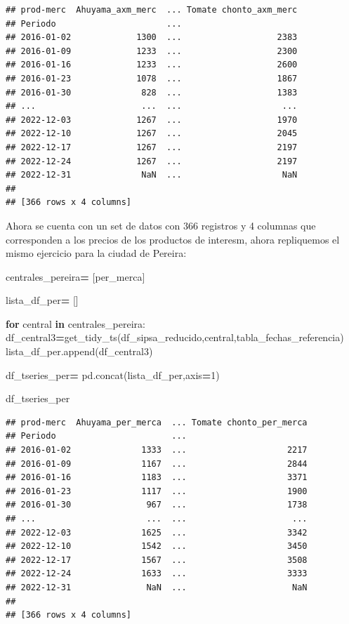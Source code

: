 \documentclass[
]{book}
\newenvironment{Shaded}{\begin{snugshade}}{\end{snugshade}}
\newcommand{\ControlFlowTok}[1]{\textcolor[rgb]{0.13,0.29,0.53}{\textbf{#1}}}
\newcommand{\DecValTok}[1]{\textcolor[rgb]{0.00,0.00,0.81}{#1}}
\newcommand{\KeywordTok}[1]{\textcolor[rgb]{0.13,0.29,0.53}{\textbf{#1}}}
\newcommand{\NormalTok}[1]{#1}
\newcommand{\OperatorTok}[1]{\textcolor[rgb]{0.81,0.36,0.00}{\textbf{#1}}}
\newcommand{\StringTok}[1]{\textcolor[rgb]{0.31,0.60,0.02}{#1}}
\begin{document}
\begin{verbatim}
## prod-merc  Ahuyama_axm_merc  ... Tomate chonto_axm_merc
## Periodo                      ...                       
## 2016-01-02             1300  ...                   2383
## 2016-01-09             1233  ...                   2300
## 2016-01-16             1233  ...                   2600
## 2016-01-23             1078  ...                   1867
## 2016-01-30              828  ...                   1383
## ...                     ...  ...                    ...
## 2022-12-03             1267  ...                   1970
## 2022-12-10             1267  ...                   2045
## 2022-12-17             1267  ...                   2197
## 2022-12-24             1267  ...                   2197
## 2022-12-31              NaN  ...                    NaN
## 
## [366 rows x 4 columns]
\end{verbatim}

Ahora se cuenta con un set de datos con 366 registros y 4 columnas que corresponden a los precios de los productos de interesm, ahora repliquemos el mismo ejercicio para la ciudad de Pereira:

\begin{Shaded}
\begin{Highlighting}[]

\NormalTok{centrales\_pereira}\OperatorTok{=}\NormalTok{  [}\StringTok{\textquotesingle{}per\_merca\textquotesingle{}}\NormalTok{]}

\NormalTok{lista\_df\_per}\OperatorTok{=}\NormalTok{ []}

\ControlFlowTok{for}\NormalTok{ central }\KeywordTok{in}\NormalTok{ centrales\_pereira:}
\NormalTok{    df\_central3}\OperatorTok{=}\NormalTok{get\_tidy\_ts(df\_sipsa\_reducido,central,tabla\_fechas\_referencia)}
\NormalTok{    lista\_df\_per.append(df\_central3)}

\NormalTok{df\_tseries\_per}\OperatorTok{=}\NormalTok{ pd.concat(lista\_df\_per,axis}\OperatorTok{=}\DecValTok{1}\NormalTok{)}

\NormalTok{df\_tseries\_per}
\end{Highlighting}
\end{Shaded}

\begin{verbatim}
## prod-merc  Ahuyama_per_merca  ... Tomate chonto_per_merca
## Periodo                       ...                        
## 2016-01-02              1333  ...                    2217
## 2016-01-09              1167  ...                    2844
## 2016-01-16              1183  ...                    3371
## 2016-01-23              1117  ...                    1900
## 2016-01-30               967  ...                    1738
## ...                      ...  ...                     ...
## 2022-12-03              1625  ...                    3342
## 2022-12-10              1542  ...                    3450
## 2022-12-17              1567  ...                    3508
## 2022-12-24              1633  ...                    3333
## 2022-12-31               NaN  ...                     NaN
## 
## [366 rows x 4 columns]
\end{verbatim}
\end{document}

